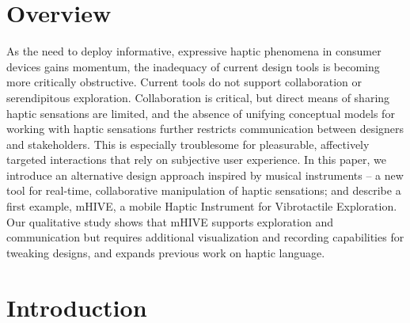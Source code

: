 




\section{Overview}
As the need to deploy informative, expressive haptic phenomena in consumer devices gains momentum, the inadequacy of current design tools is becoming more critically obstructive.
Current tools do not support collaboration or serendipitous exploration.
Collaboration is critical,
but direct means of sharing haptic sensations are limited,
and the absence of unifying conceptual models for working with haptic sensations further restricts communication between designers and stakeholders.
This is especially troublesome for pleasurable, affectively targeted interactions that rely on 
subjective user experience.
In this paper, we introduce an alternative design approach
inspired by musical instruments -- a new tool for real-time, collaborative manipulation of haptic sensations;
and describe 
a first example, mHIVE, a mobile Haptic Instrument for Vibrotactile Exploration.
Our qualitative study shows that mHIVE supports exploration and communication but
requires additional visualization and recording capabilities for tweaking designs,
and expands previous work on haptic language.





\section{Introduction}

